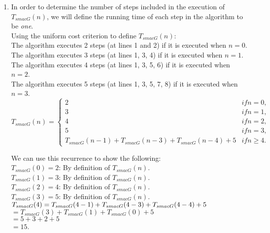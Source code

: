 \documentclass{article}
\begin{document}
\begin{enumerate}
\begin{verbatim}
    }
}
\end{verbatim}

\pagebreak

    \item
    
    In order to determine the number of steps included in the execution of $T_{smacG}(n)$, we will define the running time of each step in the algorithm to be \textit{one}.\\

    Using the uniform cost criterion to define $T_{smacG}(n)$: \\
    
    The algorithm executes 2 steps (at lines 1 and 2) if it is executed when $n = 0$. \\
    The algorithm executes 3 steps (at lines 1, 3, 4) if it is executed when $n = 1$. \\
    The algorithm executes 4 steps (at lines 1, 3, 5, 6) if it is executed when $n = 2$. \\
    The algorithm executes 5 steps (at lines 1, 3, 5, 7, 8) if it is executed when $n = 3$. \\
    
    
    \[ T_{smacG}(n) = \begin{cases} 
          2 & if n = 0, \\
          3 & if n = 1, \\
          4 & if n = 2, \\
          5 & if n = 3, \\
          T_{smacG}(n-1) + T_{smacG}(n-3) + T_{smacG}(n-4) + 5 & if n \geq 4.
       \end{cases}
    \]
    
    We can use this recurrence to show the following:\\
    
    $T_{smacG}(0)=2$: By definition of $T_{smacG}(n)$.\\ 
    $T_{smacG}(1)=3$: By definition of $T_{smacG}(n)$.\\ 
    $T_{smacG}(2)=4$: By definition of $T_{smacG}(n)$.\\ 
    $T_{smacG}(3)=5$: By definition of $T_{smacG}(n)$.\\ 
    
    $T_{smacG}(4)\\
    = T_{smacG}(4-1) + T_{smacG}(4-3) + T_{smacG}(4-4) + 5$\\
    $= T_{smacG}(3) + T_{smacG}(1) + T_{smacG}(0) + 5$ \\
    $= 5 + 3 + 2 + 5$ \\
    $= 15$. \\
    

\end{enumerate}
\end{document}
